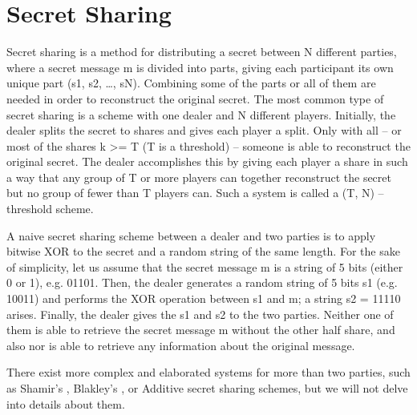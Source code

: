 \section{Secret Sharing}\label{s:secret-sharing}
Secret sharing is a method  for distributing a secret between N different parties, where a secret message m is divided into parts, giving each participant its own unique part (s1, s2, …, sN).
Combining some of the parts or all of them are needed in order to reconstruct the original secret. The most common type of secret sharing is a scheme with one dealer and N different players.
Initially, the dealer splits the secret to shares and gives each player a split. Only with all – or most of the shares k >= T  (T is a threshold) – someone is able to reconstruct the original secret.
The dealer accomplishes this by giving each player a share in such a way that any group of T or more players can together reconstruct the secret but no group of fewer than T players can. Such a system is called a (T, N) – threshold scheme.

A naive secret sharing scheme between a dealer and two parties is to apply bitwise XOR to the secret and a random string of the same length.
For the sake of simplicity, let us assume that the secret message m is a string of 5 bits (either 0 or 1), e.g. 01101.
Then, the dealer generates a random string of 5 bits s1 (e.g. 10011) and performs the XOR operation between s1 and m; a string s2 = 11110 arises.
Finally, the dealer gives the s1 and s2 to the two parties.
Neither one of them is able to retrieve the secret message m without the other half share, and also nor is able to retrieve any information about the original message.

There exist more complex and elaborated systems for more than two parties, such as Shamir’s \cite{shamir1979share}, Blakley’s \cite{blakley1994linear}, or Additive \cite{kim2003designs} secret sharing schemes, but we will not delve into details about them.
